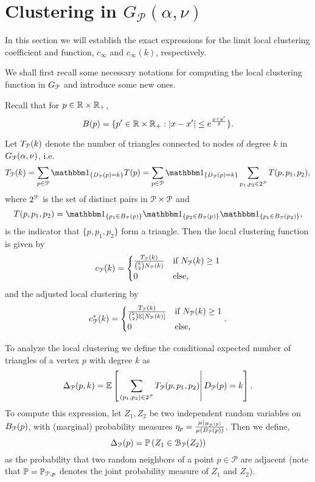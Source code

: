 \section{Clustering in $G_{\mathcal{P}}(\alpha, \nu)$}\label{sec:asymptotics_average_clustering_ast_P}

In this section we will establish the exact expressions for the limit local clustering coefficient and function, $c_\infty$ and $c_{\infty}(k)$, respectively.

We shall first recall some necessary notations for computing the local clustering function in $G_{{\mathcal P}}$ and introduce some new ones. 

Recall that for $p\in {\ensuremath{\mathbb R}} \times {\ensuremath{\mathbb R}}_+$,
\[
	B(p) = \{p^\prime \in {\ensuremath{\mathbb R}} \times {\ensuremath{\mathbb R}}_+ : |x - x^\prime| \le e^{\frac{y + y^\prime}{2}}\}.
\]

Let $T_{{\mathcal P}}(k)$ denote the number of triangles connected to nodes of degree $k$ in $G_{{\mathcal P}}(\alpha, \nu)$, i.e.
\[
	T_{\Pcal}(k) = \sum_{p \in \Pcal} \ind{D_\Pcal(p) = k} T(p) = \sum_{p \in \Pcal} \ind{D_\Pcal(p) = k} \sum_{p_1, p_2 \in 2^\Pcal} T(p,p_1,p_2),
\]
where $2^{{\mathcal P}}$ is the set of distinct pairs in ${\mathcal P} \times {\mathcal P}$ and
\[
	T(p,p_1,p_2) = \ind{p_1 \in B_\Pcal(p)} \ind{p_2 \in B_\Pcal(p)} \ind{p_1 \in B_\Pcal(p_2)},
\]
is the indicator that $\{p, p_1, p_2\}$ form a triangle. Then the local clustering function is given by
\begin{equation}\label{eq:def_local_clustering_P}
	c_{{\mathcal P}}(k) = \begin{cases} 
		\frac{T_{{\mathcal P}}(k)}{\binom{k}{2} N_{{\mathcal P}}(k)} &\mbox{if } N_{{\mathcal P}}(k) \ge 1\\
		0 &\mbox{else,}
		\end{cases}
\end{equation}
and the adjusted local clustering by
\begin{equation}\label{eq:def_local_clustering_ast_P}
	c_{{\mathcal P}}^\ast(k) = \begin{cases} 
		\frac{T_{{\mathcal P}}(k)}{\binom{k}{2} \mathbb{E}\left[N_{{\mathcal P}}(k)\right]} &\mbox{if } N_{{\mathcal P}}(k) \ge 1\\
		0 &\mbox{else,}
		\end{cases}.
\end{equation}

To analyze the local clustering we define the conditional expected number of triangles of a vertex $p$ with degree $k$ as
\[
	\Delta_{{\mathcal P}}(p,k) = \mathbb{E}\left[\left.\sum_{(p_1, p_2) \in 2^{{\mathcal P}}} T_{{\mathcal P}}(p, p_1, p_2)\right|D_{{\mathcal P}}(p) = k\right].
\]
To compute this expression, let $Z_{1}, Z_{2}$ be two independent random variables on $B_{{\mathcal P}}(p)$, with (marginal) probability measures $\eta_{p} = \frac{\mu|_{B_{{\mathcal P}}(p)}}{\mu(B_{{\mathcal P}}(p))}$. Then we define,
\begin{equation}\label{eq:def_delta_p}
	\Delta_{\Pcal}(p) = \Prob{ Z_{1} \in \mathcal{B}_{\Pcal}(Z_{2})} %
\end{equation}
as the probability that two random neighbors of a point $p \in \mathcal{P}$ are adjacent (note that $\mathbb{P} = \mathbb{P}_{\mathcal{P},p}$ denotes the joint probability measure of $Z_1$ and $Z_2$).

